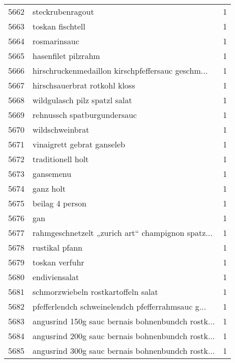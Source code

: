 \begin{tabular}{llr}
5662 &                                   steckrubenragout &      1 \\
5663 &                                   toskan fischtell &      1 \\
5664 &                                       rosmarinsauc &      1 \\
5665 &                                hasenfilet pilzrahm &      1 \\
5666 &  hirschruckenmedaillon kirschpfeffersauc geschm... &      1 \\
5667 &                      hirschsauerbrat rotkohl kloss &      1 \\
5668 &                      wildgulasch pilz spatzl salat &      1 \\
5669 &                        rehnussch spatburgundersauc &      1 \\
5670 &                                    wildschweinbrat &      1 \\
5671 &                         vinaigrett gebrat ganseleb &      1 \\
5672 &                                  traditionell holt &      1 \\
5673 &                                          gansemenu &      1 \\
5674 &                                          ganz holt &      1 \\
5675 &                                    beilag 4 person &      1 \\
5676 &                                                gan &      1 \\
5677 &  rahmgeschnetzelt „zurich art“ champignon spatz... &      1 \\
5678 &                                     rustikal pfann &      1 \\
5679 &                                     toskan verfuhr &      1 \\
5680 &                                      endiviensalat &      1 \\
5681 &                schmorzwiebeln rostkartoffeln salat &      1 \\
5682 &  pfefferlendch schweinelendch pfefferrahmsauc g... &      1 \\
5683 &  angusrind 150g sauc bernais bohnenbundch rostk... &      1 \\
5684 &  angusrind 200g sauc bernais bohnenbundch rostk... &      1 \\
5685 &  angusrind 300g sauc bernais bohnenbundch rostk... &      1 \\

\end{tabular}
